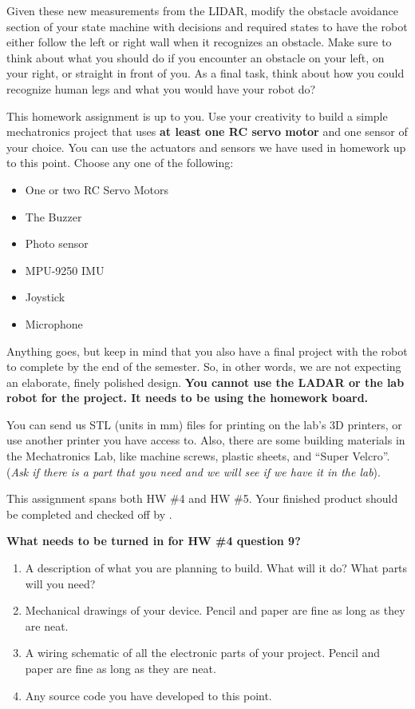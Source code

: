 \documentclass[11pt]{article}
\begin{document}
%
Given these new measurements from the LIDAR, modify the obstacle avoidance section of your state machine with decisions and required states to have the robot either follow the left or right wall when it recognizes an obstacle. Make sure to think about what you should do if you encounter an obstacle on your left, on your right, or straight in front of you. As a final task, think about how you could recognize human legs and what you would have your robot do?


This homework assignment is up to you. Use your creativity to build a simple mechatronics project that uses \textbf{at least one RC servo motor} and one sensor of your choice. You can use the actuators and sensors we have used in homework up to this point. Choose any one of the following:
\begin{itemize}
    \item One or two RC Servo Motors
    \item The Buzzer
    \item Photo sensor
    \item MPU-9250 IMU
    \item Joystick
    \item Microphone
\end{itemize}
Anything goes, but keep in mind that you also have a final project with the robot to complete by the end of the semester. So, in other words, we are not expecting an elaborate, finely polished design. \textbf{You cannot use the LADAR or the lab robot for the project. It needs to be using the homework board.}

You can send us STL (units in mm) files for printing on the lab’s 3D printers, or use another printer you have access to. Also, there are some building materials in the Mechatronics Lab, like machine screws, plastic sheets, and “Super Velcro”. (\textit{Ask if there is a part that you need and we will see if we have it in the lab}).

This assignment spans both HW \#4 and HW \#5. Your finished product should be completed and checked off by .

\textbf{What needs to be turned in for HW \#4 question 9?}
%
\begin{enumerate}
    \item A description of what you are planning to build. What will it do? What parts will you need?
    \item Mechanical drawings of your device. Pencil and paper are fine as long as they are neat.
    \item A wiring schematic of all the electronic parts of your project. Pencil and paper are fine as long as they are neat.
    \item Any source code you have developed to this point.
\end{enumerate}
%
%
\MakeFooter
%
\end{document}
